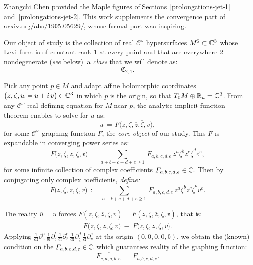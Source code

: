 \documentclass[12pt,twoside,leqno,openany]{amsart}
\begin{document}
\medskip{}
Zhangchi Chen provided the Maple figures of 
Sections~{\ref{prolongations-jet-1}}
and~{\ref{prolongations-jet-2}}.
This work supplements
the convergence part of {\tiny\sf arxiv.org/abs/1905.05629/},
whose formal part was inspiring.

\label{C-2-1-hypersurfaces-M5-C3}

Our object of study is the collection
of real $\mathcal{C}^\omega$ hypersurfaces $M^5 \subset \mathbb{C}^3$
whose Levi form is of constant rank $1$ at every point
and that are everywhere $2$-nondegenerate
({\em see} below), a {\sl class}
that we will denote as:
\[
\mathfrak{C}_{2,1}.
\]

Pick any point $p \in M$ and adapt affine holomorphic coordinates
$\big(z, \zeta, w = u + i\, v\big) \in \mathbb{C}^3$ 
in which $p$ is the origin, 
so that 
$T_0 M \oplus \mathbb{R}_u = \mathbb{C}^3$.  From any $\mathcal{C}^\omega$ 
real defining
equation for $M$ near $p$, the analytic implicit function theorem
enables to solve for $u$ as:
\[
u
\,=\,
F\big(z,\zeta,\overline{z},\overline{\zeta},v\big),
\]
for some $\mathcal{C}^\omega$ graphing function $F$, the 
{\sl core object} of our study. 
This $F$ is expandable in converging
power series as:
\[
F
\big(
z,\zeta,\overline{z},\overline{\zeta},v
\big)
\,=\,
\sum_{a+b+c+d+e\geqslant 1}\,
F_{a,b,c,d,e}\,
z^a\zeta^b\overline{z}^c\overline{\zeta}^dv^e,
\]
for some infinite collection of complex coefficients
$F_{a,b,c,d,e} \in \mathbb{C}$. Then by conjugating
only complex coefficients, {\sl define:}
\[
\overline{F}
\big(z,\zeta,\overline{z},\overline{\zeta},v\big)
\,:=\,
\sum_{a+b+c+d+e\geqslant 1}\,
\overline{F}_{a,b,c,d,e}\,
z^a\zeta^b\overline{z}^c\overline{\zeta}^dv^e.
\]

The reality $\overline{u} = u$ forces
$\overline{F(z,\zeta,\overline{z},\overline{\zeta},v)} 
= F(z,\zeta,\overline{z},\overline{\zeta},v)$, that is:
\leqnomode{}
\begin{align}
\label{Fbar-F-identity}
\overline{F}
\big(
\overline{z},\overline{\zeta},z,\zeta,v
\big)
\,\equiv\,
F
\big(
z,\zeta,\overline{z},\overline{\zeta},v
\big).
\end{align}
Applying $\frac{1}{a!}\partial_z^a\,
\frac{1}{b!} \partial_\zeta^b\,
\frac{1}{c!} \partial_{\overline{z}}^c\,
\frac{1}{d!} \partial_{\overline{\zeta}}^d\,
\frac{1}{e!} \partial_v^e$ at the origin
$(0, 0, 0, 0, 0)$, we obtain
the (known) condition on the $F_{a,b,c,d,e} \in \mathbb{C}$ 
which guarantees reality of the graphing function:
\[
\overline{F_{c,d,a,b,e}}
\,=\,
F_{a,b,c,d,e}.
\]
\end{document}
